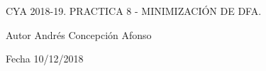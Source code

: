 C\+YA 2018-\/19. P\+R\+A\+C\+T\+I\+CA 8 -\/ M\+I\+N\+I\+M\+I\+Z\+A\+C\+IÓN DE D\+FA.

\begin{DoxyAuthor}{Autor}
Andrés Concepción Afonso 
\end{DoxyAuthor}
\begin{DoxyDate}{Fecha}
10/12/2018 
\end{DoxyDate}
